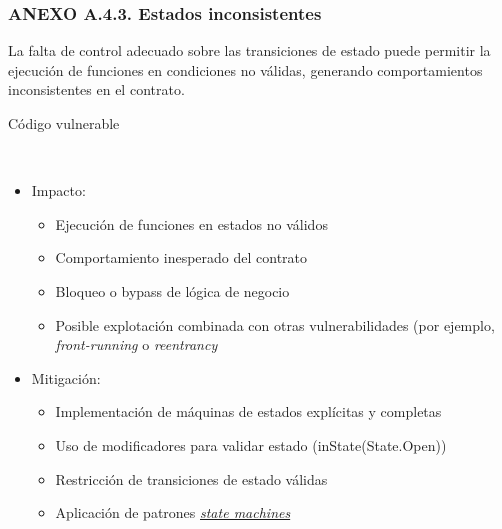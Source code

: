 \subsubsection{ANEXO A.4.3. Estados
inconsistentes}\label{anexo-a.4.3.-estados-inconsistentes}

La falta de control adecuado sobre las transiciones de estado puede
permitir la ejecución de funciones en condiciones no válidas, generando
comportamientos inconsistentes en el contrato.

Código vulnerable

\begin{Shaded}
\begin{Highlighting}[]
\OperatorTok{,}

\OperatorTok{;}

 \NormalTok{() }\NormalTok{ \{}

\OperatorTok{=}\OperatorTok{;}

\NormalTok{\}}

 \NormalTok{() }

    \OperatorTok{==}\NormalTok{)}\OperatorTok{;}

\NormalTok{\}}
\end{Highlighting}
\end{Shaded}

\begin{itemize}
\tightlist
\item
  Impacto:

  \begin{itemize}
  \tightlist
  \item
    Ejecución de funciones en estados no válidos
  \item
    Comportamiento inesperado del contrato
  \item
    Bloqueo o bypass de lógica de negocio
  \item
    Posible explotación combinada con otras vulnerabilidades (por
    ejemplo, \emph{front-running} o \emph{reentrancy}
  \end{itemize}
\item
  Mitigación:

  \begin{itemize}
  \tightlist
  \item
    Implementación de máquinas de estados explícitas y completas
  \item
    Uso de modificadores para validar estado (inState(State.Open))
  \item
    Restricción de transiciones de estado válidas
  \item
    Aplicación de patrones
    \href{https://fravoll.github.io/solidity-patterns/state_machine.html}{\emph{state
    machines}}
  \end{itemize}
\end{itemize}

